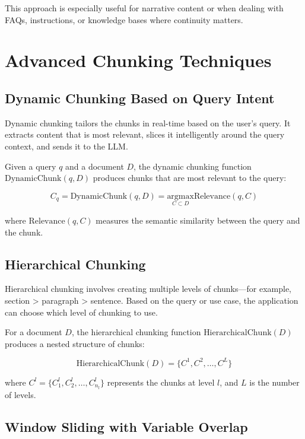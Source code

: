 \documentclass{article}
\begin{document}
This approach is especially useful for narrative content or when dealing with FAQs, instructions, or knowledge bases where continuity matters.

\section{Advanced Chunking Techniques}

\subsection{Dynamic Chunking Based on Query Intent}

Dynamic chunking tailors the chunks in real-time based on the user's query. It extracts content that is most relevant, slices it intelligently around the query context, and sends it to the LLM.

Given a query $q$ and a document $D$, the dynamic chunking function $\textrm{DynamicChunk}(q, D)$ produces chunks that are most relevant to the query:

\begin{equation}
C_q = \textrm{DynamicChunk}(q, D) = \underset{C \subset D}{\textrm{argmax}} \textrm{Relevance}(q, C)
\end{equation}

where $\textrm{Relevance}(q, C)$ measures the semantic similarity between the query and the chunk.

\subsection{Hierarchical Chunking}

Hierarchical chunking involves creating multiple levels of chunks—for example, section > paragraph > sentence. Based on the query or use case, the application can choose which level of chunking to use.

For a document $D$, the hierarchical chunking function $\textrm{HierarchicalChunk}(D)$ produces a nested structure of chunks:

\begin{equation}
\textrm{HierarchicalChunk}(D) = \{C^1, C^2, \ldots, C^L\}
\end{equation}

where $C^l = \{C^l_1, C^l_2, \ldots, C^l_{n_l}\}$ represents the chunks at level $l$, and $L$ is the number of levels.

\subsection{Window Sliding with Variable Overlap}
\end{document}
